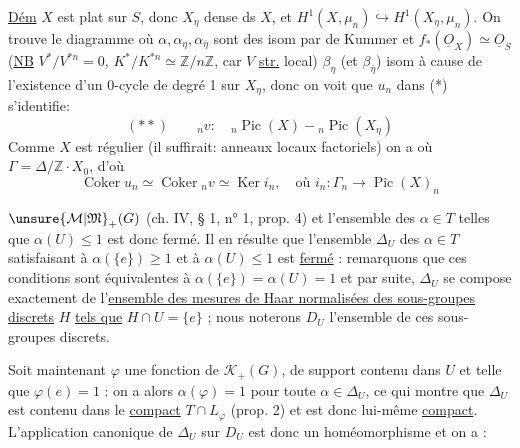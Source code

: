 \uline{Dém} $X$ est plat sur $S$, donc $X_\eta$ dense ds $X$, et $H^1(X,\mu_n)\hookrightarrow H^1(X_\eta,\mu_n)$. On trouve le diagramme
où $\alpha,\alpha_\eta,\alpha_{\bar\eta}$ sont des isom par  de Kummer et $f_*(\underline O_X)\simeq\underline O_S$ (\uline{NB} $V^*/V^{*n}=0$, $K^*/K^{*n}\simeq\mathbb Z/n\mathbb Z$, car $V$ \uline{str.} local) $\beta_\eta$ (et $\beta_{\bar\eta}$)  isom à cause de l'existence d'un 0-cycle de degré 1 sur $X_\eta$, donc on voit que $u_n$ dans (*) s'identifie:
\[
(**)\qquad{}_nv:\quad{}_n\operatorname{Pic}(X)\mathbin{-}{}_n\operatorname{Pic}(X_\eta)
\]
Comme $X$ est régulier (il suffirait: anneaux locaux factoriels) on a
où $\Gamma=\Delta/\mathbb Z\cdot X_0$, d'où
\[
\operatorname{Coker}u_n\simeq\operatorname{Coker}{}_nv\simeq\operatorname{Ker}i_n,\quad\text{où }i_n:\Gamma_n\longrightarrow\operatorname{Pic}(X)_n
\]


$\unsure{\mathcal M|\mathfrak M}_+(G)$ (ch. IV, § 1, n° 1, prop. 4) et l'ensemble des $\alpha\in T$ telles que $\alpha(U)\leq 1$ est donc fermé. Il en résulte que l'ensemble $\Delta_U$ des $\alpha\in T$ satisfaisant à $\alpha(\{e\})\geq 1$ et à $\alpha(U)\leq 1$ est \uline{fermé} : remarquons que ces conditions sont équivalentes à $\alpha(\{e\})=\alpha(U)=1$ et par suite, $\Delta_U$ se compose exactement de l'\uline{ensemble des mesures de Haar normalisées des sous-groupes discrets} $H$ \uline{tels que} $H\cap U=\{e\}$ ; nous noterons $D_U$ l'ensemble de ces sous-groupes discrets.

Soit maintenant $\varphi$ une fonction de $\mathcal K_+(G)$, de support contenu dans $U$ et telle que $\varphi(e)=1$ : on a alors $\alpha(\varphi)=1$ pour toute $\alpha\in\Delta_U$, ce qui montre que $\Delta_U$ est contenu dans le \uline{compact} $T\cap L_\varphi$ (prop. 2) et est donc lui-même \uline{compact}. L'application canonique de $\Delta_U$ sur $D_U$ est donc un homéomorphisme et on a :

